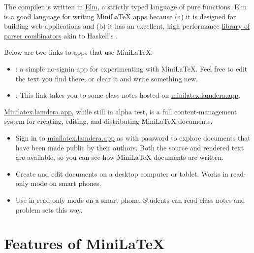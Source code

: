 The compiler is written in \href{https://elm-lang.org}{Elm}, a strictly typed language of pure functions.  Elm is a good language for writing MiniLaTeX apps because (a) it is designed for building web applications and (b) it has an excellent, high performance  \href{https://package.elm-lang.org/packages/elm/parser/latest/}{library of parser combinators} akin to Haskell's .



Below are two links to  apps that use  MiniLaTeX.

\begin{itemize}

\item {}: a simple no-signin app for experimenting with MiniLaTeX.  Feel free to edit the text you find there, or clear it and write something new.

\item {}:  This link takes you to some class notes
hosted on \href{https://minilatex.lamdera.app}{minilatex.lamdera.app}.

\end{itemize}

\href{https://minilatex.lamdera.app}{Minilatex.lamdera.app}, while still in alpha test, is a full content-management system for creating, editing, and distributing MiniLaTeX documents.

\begin{itemize}

\item {} Sign in to \href{https://minilatex.lamdera.app}{minilatex.lamdera.app}
as  with password  to explore documents that have been made public by their authors.  Both the source and rendered text are available, so you can see how MiniLaTeX documents are written.

\item {} Create and edit documents on a desktop computer or tablet. Works in read-only mode on smart phones.

\item {} Use in read-only mode on a smart phone. Students can read class notes and problem sets this way.

\end{itemize}


\section{Features of MiniLaTeX}

